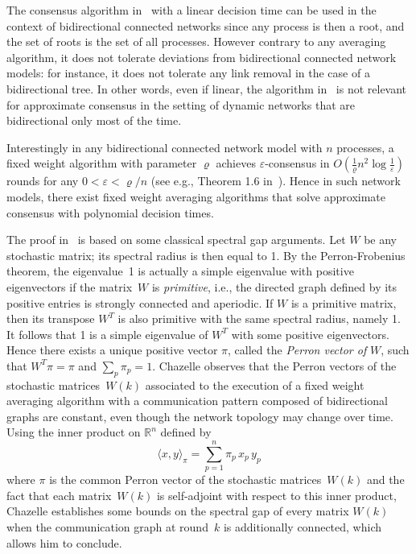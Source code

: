 \documentclass[a4paper]{article}
\theoremstyle{newthm}
\newcommand{\IR}{\mathds{R}}
\begin{document}
The consensus algorithm in~\cite{BRS12} with a linear decision time can be used in the context of bidirectional connected 
	networks since any process is then a root, and the set of roots is the set of all processes.
However  contrary to any  averaging algorithm, it does not tolerate
	deviations from bidirectional connected network models: for instance, it does not tolerate any link removal
	in the case of a bidirectional tree.
In other words, even if linear, the algorithm in~\cite{BRS12}  is not relevant for approximate consensus
	in the setting of dynamic networks that are bidirectional only most of the time.

Interestingly in any bidirectional connected network model with $n$
     processes, a fixed weight algorithm with parameter $\varrho$
     achieves $\varepsilon$-consensus in $O(\frac{1}{\varrho} n^2
     \log\frac{1}{\varepsilon})$ rounds for any $0 <\varepsilon
     <\varrho/n$ (see e.g., Theorem 1.6 in~\cite{Cha13}).
Hence in such network models, there exist fixed weight averaging
     algorithms that solve approximate consensus with polynomial
     decision times.
	
The proof in~\cite{Cha13} is based on some classical spectral gap arguments.
Let $W$ be any stochastic matrix; its  spectral radius is then equal to 1.
By the Perron-Frobenius theorem, the eigenvalue~1  is actually a simple 
	eigenvalue with positive eigenvectors if the matrix~$W$ is {\em primitive}, i.e., 
	the directed graph defined by
	its positive entries is strongly connected and aperiodic.
If $W$ is a primitive matrix, then  its transpose $W^T$ is also  primitive with the same spectral radius, 
	namely 1.
It follows that  1 is a simple eigenvalue of  $W^T$ with some  positive
	eigenvectors.
Hence there exists a unique positive vector $\pi$, called the {\em Perron vector of} $W$,
	such that $W^T \pi = \pi$  and  $\sum_p \pi_p = 1$.
Chazelle observes that  the Perron vectors of the stochastic matrices~$W(k)$
	associated to the execution of a fixed weight averaging algorithm with a communication
	pattern composed of bidirectional  graphs
	are constant, even though the network topology may change over time.
Using the inner product on $\IR^n$  defined by
	$$\langle x, y \rangle_{\pi} = \sum_{p=1}^n \pi_p \, x_p \, y_p $$
	where $\pi$ is the common Perron vector of the stochastic matrices~$W(k)$
	and the fact that each matrix~$W(k)$ is self-adjoint with respect to this inner product, 
	Chazelle establishes some bounds on the spectral gap of every matrix $W(k)$ when the communication 
	graph at round~$k$  is additionally connected,
	which allows him to conclude.
	
\end{document}

